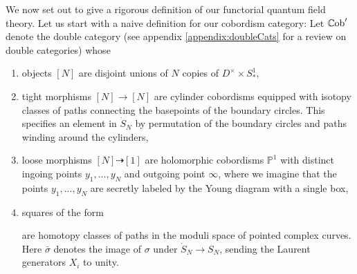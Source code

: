 \documentclass[11pt]{report}
\theoremstyle{definition}
\theoremstyle{remark}
\theoremstyle{remark}
\newcommand{\id}{\textnormal{id}}
\renewcommand{\P}{\mathbb{P}}
\begin{document}
We now set out to give a rigorous definition of our functorial quantum field theory. Let us start with a naive definition for our cobordism category: Let $\mathbb{C}\textnormal{ob}'$ denote the double category (see appendix \ref{appendix:doubleCats} for a review on double categories) whose
\begin{enumerate}[label=(\roman*)]
\item objects $[N]$ are disjoint unions of $N$ copies of $D^\times \times S_*^1$,%
\item tight morphisms $[N] \longrightarrow [N]$ are cylinder cobordisms equipped with isotopy classes of paths connecting the basepoints of the boundary circles. This specifies an element in $\dot S_N$ by permutation of the boundary circles and paths winding around the cylinders,
\item loose morphisms $[N] \dashrightarrow [1]$ are holomorphic cobordisms $\P^1$ with distinct ingoing points $y_1,...,y_N$ and outgoing point $\infty$, where we imagine that the points $y_1,...,y_N$ are secretly labeled by the Young diagram with a single box,
\item squares of the form
\begin{center}
\end{center}
are homotopy classes of paths in the moduli space of pointed complex curves. Here $\bar \sigma$ denotes the image of $\sigma$ under $\dot S_N \to S_N$, sending the Laurent generators $X_i$ to unity.
\end{enumerate}
\end{document}
